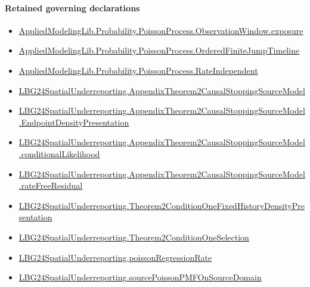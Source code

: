 \documentclass[10pt]{article}
\begin{document}
\paragraph{Retained governing declarations}
\begin{itemize}\raggedright
\item \hyperlink{governing-declaration-8fb09c88b06e0c96}{Applied\allowbreak{}Modeling\allowbreak{}Lib.\allowbreak{}Probability.\allowbreak{}Poisson\allowbreak{}Process.\allowbreak{}Observation\allowbreak{}Window.\allowbreak{}exposure}
\item \hyperlink{governing-declaration-f690c3c90ba9b3a6}{Applied\allowbreak{}Modeling\allowbreak{}Lib.\allowbreak{}Probability.\allowbreak{}Poisson\allowbreak{}Process.\allowbreak{}Ordered\allowbreak{}Finite\allowbreak{}Jump\allowbreak{}Timeline}
\item \hyperlink{governing-declaration-087044531336cf25}{Applied\allowbreak{}Modeling\allowbreak{}Lib.\allowbreak{}Probability.\allowbreak{}Poisson\allowbreak{}Process.\allowbreak{}Rate\allowbreak{}Independent}
\item \hyperlink{paper-prerequisite-2f0b30d7fa1d57d0}{LBG24\allowbreak{}Spatial\allowbreak{}Underreporting.\allowbreak{}Appendix\allowbreak{}Theorem2\allowbreak{}Causal\allowbreak{}Stopping\allowbreak{}Source\allowbreak{}Model}
\item \hyperlink{paper-prerequisite-389857bc4c8477de}{LBG24\allowbreak{}Spatial\allowbreak{}Underreporting.\allowbreak{}Appendix\allowbreak{}Theorem2\allowbreak{}Causal\allowbreak{}Stopping\allowbreak{}Source\allowbreak{}Model.\allowbreak{}Endpoint\allowbreak{}Density\allowbreak{}Presentation}
\item \hyperlink{governing-declaration-14dc9c88dba1e06b}{LBG24\allowbreak{}Spatial\allowbreak{}Underreporting.\allowbreak{}Appendix\allowbreak{}Theorem2\allowbreak{}Causal\allowbreak{}Stopping\allowbreak{}Source\allowbreak{}Model.\allowbreak{}conditional\allowbreak{}Likelihood}
\item \hyperlink{governing-declaration-7cf05f25acbc109f}{LBG24\allowbreak{}Spatial\allowbreak{}Underreporting.\allowbreak{}Appendix\allowbreak{}Theorem2\allowbreak{}Causal\allowbreak{}Stopping\allowbreak{}Source\allowbreak{}Model.\allowbreak{}rate\allowbreak{}Free\allowbreak{}Residual}
\item \hyperlink{paper-prerequisite-fc4b987b63d7ffe8}{LBG24\allowbreak{}Spatial\allowbreak{}Underreporting.\allowbreak{}Theorem2\allowbreak{}Condition\allowbreak{}One\allowbreak{}Fixed\allowbreak{}History\allowbreak{}Density\allowbreak{}Presentation}
\item \hyperlink{governing-declaration-b86695ea0bdc7438}{LBG24\allowbreak{}Spatial\allowbreak{}Underreporting.\allowbreak{}Theorem2\allowbreak{}Condition\allowbreak{}One\allowbreak{}Selection}
\item \hyperlink{paper-prerequisite-7f3c5743111cd486}{LBG24\allowbreak{}Spatial\allowbreak{}Underreporting.\allowbreak{}poisson\allowbreak{}Regression\allowbreak{}Rate}
\item \hyperlink{governing-declaration-9a24d22062827cef}{LBG24\allowbreak{}Spatial\allowbreak{}Underreporting.\allowbreak{}source\allowbreak{}Poisson\allowbreak{}PMF\allowbreak{}On\allowbreak{}Source\allowbreak{}Domain}
\end{itemize}
\end{document}
